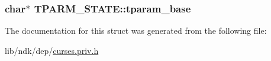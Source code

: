 \hypertarget{struct_t_p_a_r_m___s_t_a_t_e_a1f4948bf33bc1df1c3697e9abe770184}{
\subsubsection[{tparam\-\_\-base}]{ char$\ast$ T\-P\-A\-R\-M\-\_\-\-S\-T\-A\-T\-E\-::tparam\-\_\-base}}\label{struct_t_p_a_r_m___s_t_a_t_e_a1f4948bf33bc1df1c3697e9abe770184}


The documentation for this struct was generated from the following file\-:\begin{DoxyCompactItemize}
\item 
lib/ndk/dep/\hyperlink{curses_8priv_8h}{curses.\-priv.\-h}\end{DoxyCompactItemize}
